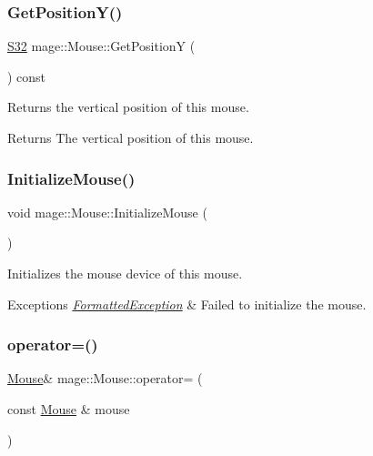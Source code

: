 \subsubsection{\texorpdfstring{Get\+Position\+Y()}{GetPositionY()}}
{\footnotesize\ttfamily \hyperlink{namespacemage_a642e05c5c83642b6946703615cdbf2da}{S32} mage\+::\+Mouse\+::\+Get\+PositionY (\begin{DoxyParamCaption}{ }\end{DoxyParamCaption}) const\hspace{0.3cm}{\ttfamily [noexcept]}}

Returns the vertical position of this mouse.

\begin{DoxyReturn}{Returns}
The vertical position of this mouse. 
\end{DoxyReturn}
\hypertarget{classmage_1_1_mouse_ac158b6d6fff5b05dea5ebefa86c0d56a}{}\label{classmage_1_1_mouse_ac158b6d6fff5b05dea5ebefa86c0d56a} 
\subsubsection{\texorpdfstring{Initialize\+Mouse()}{InitializeMouse()}}
{\footnotesize\ttfamily void mage\+::\+Mouse\+::\+Initialize\+Mouse (\begin{DoxyParamCaption}{ }\end{DoxyParamCaption})\hspace{0.3cm}{\ttfamily [private]}}

Initializes the mouse device of this mouse.


\begin{DoxyExceptions}{Exceptions}
{\em \hyperlink{classmage_1_1_formatted_exception}{Formatted\+Exception}} & Failed to initialize the mouse. \\
\hline
\end{DoxyExceptions}
\hypertarget{classmage_1_1_mouse_a585119f1b0db3fbc7436c86676518c8c}{}\label{classmage_1_1_mouse_a585119f1b0db3fbc7436c86676518c8c} 
\subsubsection{\texorpdfstring{operator=()}{operator=()}\hspace{0.1cm}{\footnotesize\ttfamily [1/2]}}
{\footnotesize\ttfamily \hyperlink{classmage_1_1_mouse}{Mouse}\& mage\+::\+Mouse\+::operator= (\begin{DoxyParamCaption}\item[{const \hyperlink{classmage_1_1_mouse}{Mouse} \&}]{mouse }\end{DoxyParamCaption})\hspace{0.3cm}{\ttfamily [delete]}}

